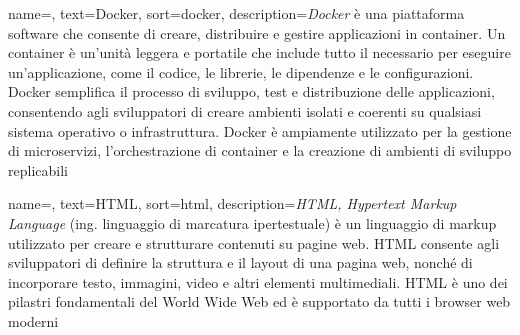  {
    name=,
    text=Docker,
    sort=docker,
    description={\emph{Docker} è una piattaforma software che consente di creare, distribuire e gestire applicazioni in container. Un container è un'unità leggera e portatile che include tutto il necessario per eseguire un'applicazione, come il codice, le librerie, le dipendenze e le configurazioni. Docker semplifica il processo di sviluppo, test e distribuzione delle applicazioni, consentendo agli sviluppatori di creare ambienti isolati e coerenti su qualsiasi sistema operativo o infrastruttura. Docker è ampiamente utilizzato per la gestione di microservizi, l'orchestrazione di container e la creazione di ambienti di sviluppo replicabili}
}

 {
    name=,
    text=HTML,
    sort=html,
    description={\emph{HTML, Hypertext Markup Language} (ing. linguaggio di marcatura ipertestuale) è un linguaggio di markup utilizzato per creare e strutturare contenuti su pagine web. HTML consente agli sviluppatori di definire la struttura e il layout di una pagina web, nonché di incorporare testo, immagini, video e altri elementi multimediali. HTML è uno dei pilastri fondamentali del World Wide Web ed è supportato da tutti i browser web moderni}
}



